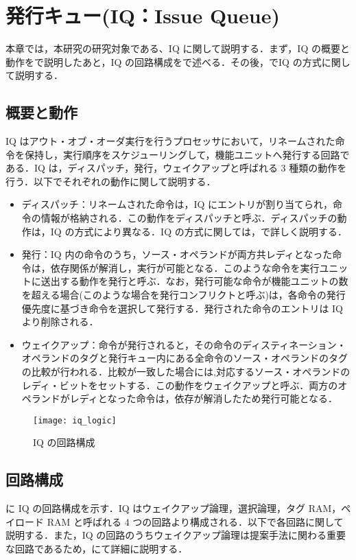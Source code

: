 
\chapter{発行キュー(IQ：Issue Queue)}
\label{sec:basic_IQ}
本章では，本研究の研究対象である、IQ に関して説明する．まず，IQ の概要と動作をで説明したあと，IQ の回路構成をで述べる．その後，でIQ の方式に関して説明する．

\section{概要と動作}
\label{sec:iq_abst}
IQ はアウト・オブ・オーダ実行を行うプロセッサにおいて，リネームされた命令を保持し，実行順序をスケジューリングして，機能ユニットへ発行する回路である．IQ は，ディスパッチ，発行，ウェイクアップと呼ばれる 3 種類の動作を行う．以下でそれぞれの動作に関して説明する．

\begin{itemize}
  \item ディスパッチ：リネームされた命令は，IQ にエントリが割り当てられ，命令の情報が格納される．この動作をディスパッチと呼ぶ．ディスパッチの動作は，IQ の方式により異なる．IQ の方式に関しては，で詳しく説明する．
  \item 発行：IQ 内の命令のうち，ソース・オペランドが両方共レディとなった命令は，依存関係が解消し，実行が可能となる．このような命令を実行ユニットに送出する動作を発行と呼ぶ．なお，発行可能な命令が機能ユニットの数を超える場合(このような場合を発行コンフリクトと呼ぶ)は，各命令の発行優先度に基づき命令を選択して発行する．発行された命令のエントリは IQ より削除される． 
  \item ウェイクアップ：命令が発行されると，その命令のディスティネーション・オペランドのタグと発行キュー内にある全命令のソース・オペランドのタグの比較が行われる．比較が一致した場合には,対応するソース・オペランドのレディ・ビットをセットする．この動作をウェイクアップと呼ぶ．両方のオペランドがレディとなった命令は，依存が解消したため発行可能となる．
\end{itemize}

\begin{figure}[thb]
  \centering
  \texttt{[image: iq\_logic]}
  \caption{IQ の回路構成}
  \label{fig:iq_logic}
\end{figure}

\section{回路構成}
\label{sec:iq_circuit}
に IQ の回路構成を示す．IQ はウェイクアップ論理，選択論理，タグ RAM，ペイロード RAM と呼ばれる 4 つの回路より構成される．以下で各回路に関して説明する．また，IQ の回路のうちウェイクアップ論理は提案手法に関わる重要な回路であるため，にて詳細に説明する．

